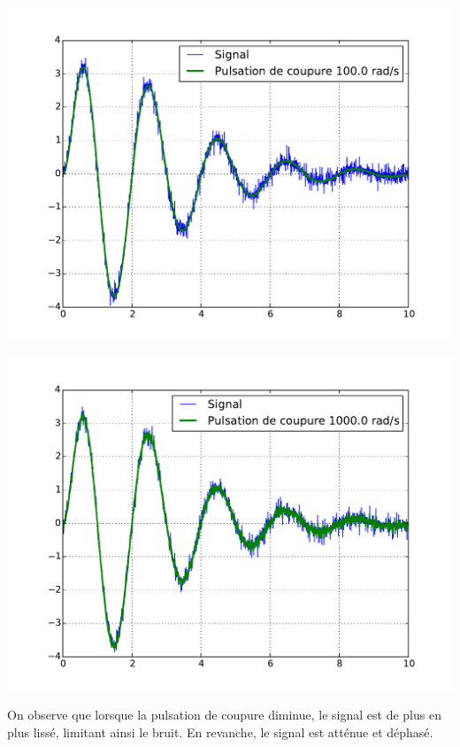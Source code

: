 \documentclass[10pt,fleqn]{article} %
\begin{document}
\begin{minipage}[c]{.43\linewidth}
\begin{center}
\includegraphics[width=\textwidth]{images/ordre1_3}
\end{center}
\end{minipage} \hfill
\begin{minipage}[c]{.43\linewidth}
\begin{center}
\includegraphics[width=\textwidth]{images/ordre1_4}
\end{center}
\end{minipage}

On observe que lorsque la pulsation de coupure diminue, le signal est de plus en plus lissé, limitant ainsi le bruit. En revanche, le signal est atténue et déphasé. 
\end{document}
